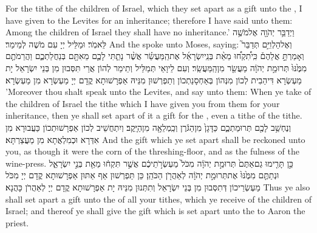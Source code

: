 {For the tithe of the children of Israel, which they set apart as a gift unto the \lord, I have given to the Levites for an inheritance; therefore I have said unto them: Among the children of Israel they shall have no inheritance.’}{}
{וַיְדַבֵּ֥ר יְהֹוָ֖ה אֶל\maqqaf מֹשֶׁ֥ה לֵּאמֹֽר׃}
{וּמַלֵּיל יְיָ עִם מֹשֶׁה לְמֵימַר׃}
{And the \lord\space spoke unto Moses, saying:}{}
{וְאֶל\maqqaf הַלְוִיִּ֣ם תְּדַבֵּר֮ וְאָמַרְתָּ֣ אֲלֵהֶם֒ כִּֽי\maqqaf תִ֠קְח֠וּ מֵאֵ֨ת בְּנֵֽי\maqqaf יִשְׂרָאֵ֜ל אֶת\maqqaf הַֽמַּעֲשֵׂ֗ר אֲשֶׁ֨ר נָתַ֧תִּי לָכֶ֛ם מֵאִתָּ֖ם בְּנַחֲלַתְכֶ֑ם וַהֲרֵמֹתֶ֤ם מִמֶּ֙נּוּ֙ תְּרוּמַ֣ת יְהֹוָ֔ה מַעֲשֵׂ֖ר מִן\maqqaf הַֽמַּעֲשֵֽׂר׃}
{וְעִם לֵיוָאֵי תְּמַלֵּיל וְתֵימַר לְהוֹן אֲרֵי תִּסְּבוּן מִן בְּנֵי יִשְׂרָאֵל יָת מַעְשְׂרָא דִּיהַבִית לְכוֹן מִנְּהוֹן בְּאַחְסָנַתְכוֹן וְתַפְרְשׁוּן מִנֵּיהּ אַפְרָשׁוּתָא קֳדָם יְיָ מַעְשְׂרָא מִן מַעְשְׂרָא׃}
{’Moreover thou shalt speak unto the Levites, and say unto them: When ye take of the children of Israel the tithe which I have given you from them for your inheritance, then ye shall set apart of it a gift for the \lord, even a tithe of the tithe.}{}
{וְנֶחְשַׁ֥ב לָכֶ֖ם תְּרוּמַתְכֶ֑ם כַּדָּגָן֙ מִן\maqqaf הַגֹּ֔רֶן וְכַֽמְלֵאָ֖ה מִן\maqqaf הַיָּֽקֶב׃}
{וְיִתְחֲשֵׁיב לְכוֹן אַפְרָשׁוּתְכוֹן כַּעֲבוּרָא מִן אִדְּרָא וּכְמִלְאֲתָא מִן מַעֲצַרְתָּא׃}
{And the gift which ye set apart shall be reckoned unto you, as though it were the corn of the threshing-floor, and as the fulness of the wine-press.}{}
{כֵּ֣ן תָּרִ֤ימוּ גַם\maqqaf אַתֶּם֙ תְּרוּמַ֣ת יְהֹוָ֔ה מִכֹּל֙ מַעְשְׂרֹ֣תֵיכֶ֔ם אֲשֶׁ֣ר תִּקְח֔וּ מֵאֵ֖ת בְּנֵ֣י יִשְׂרָאֵ֑ל וּנְתַתֶּ֤ם מִמֶּ֙נּוּ֙ אֶת\maqqaf תְּרוּמַ֣ת יְהֹוָ֔ה לְאַהֲרֹ֖ן הַכֹּהֵֽן׃}
{כֵּן תַּפְרְשׁוּן אַף אַתּוּן אַפְרָשׁוּתָא קֳדָם יְיָ מִכֹּל מַעְשְׂרֵיכוֹן דְּתִסְּבוּן מִן בְּנֵי יִשְׂרָאֵל וְתִתְּנוּן מִנֵּיהּ יָת אַפְרָשׁוּתָא קֳדָם יְיָ לְאַהֲרֹן כָּהֲנָא׃}
{Thus ye also shall set apart a gift unto the \lord\space of all your tithes, which ye receive of the children of Israel; and thereof ye shall give the gift which is set apart unto the \lord\space to Aaron the priest.}{}
